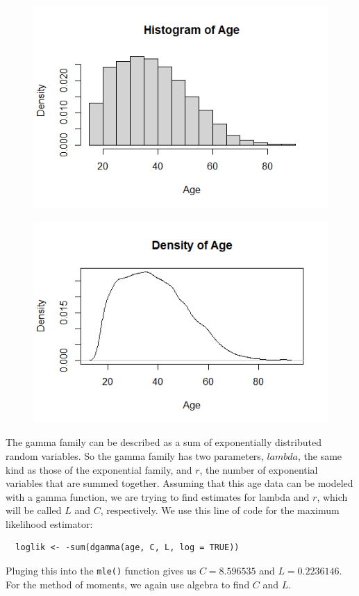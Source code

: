\documentclass[12pt, a4paper, oneside]{report}
\begin{document}
\begin{figure}[h]
  \centering
  \includegraphics[width=0.7\linewidth]{gammaHist.png}
\end{figure}

\begin{figure}[h]
  \centering
  \includegraphics[width=0.7\linewidth]{gammaDensity.png}
\end{figure}

The gamma family can be described as a sum of exponentially distributed random variables. So the gamma family has two parameters, \(lambda\), the same kind as those of the exponential family, and \(r\), the number of exponential variables that are summed together. Assuming that this age data can be modeled with a gamma function, we are trying to find estimates for lambda and \(r\), which will be called \(L\) and \(C\), respectively.
We use this line of code for the maximum likelihood estimator:
\begin{lstlisting}
  loglik <- -sum(dgamma(age, C, L, log = TRUE))
\end{lstlisting}
Pluging this into the \lstinline{mle()} function gives us \(C = 8.596535\) and \(L = 0.2236146\). 
For the method of moments, we again use algebra to find \(C\) and \(L\).

\end{document}

